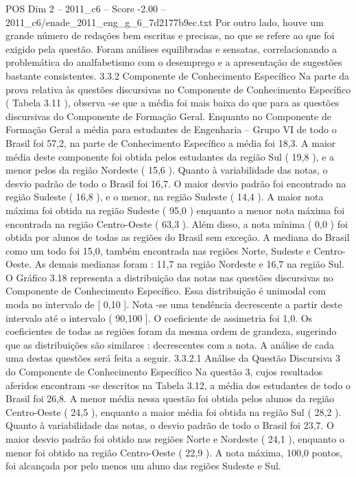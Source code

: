 \begin{textsample}{POS Dim 2 – 2011\_c6 – Score -2.00 – 2011\_c6/enade\_2011\_eng\_g\_6\_7d2177b9ec.txt}
Por outro lado, houve um grande número de redações bem escritas e precisas, no que se refere ao que foi exigido pela questão.
Foram análises equilibradas e sensatas, correlacionando a problemática do analfabetismo com o desemprego e a apresentação de sugestões bastante consistentes. 3.3.2 Componente de Conhecimento Específico Na parte da prova relativa às questões discursivas no Componente de Conhecimento Específico ( Tabela 3.11 ), observa -se que a média foi mais baixa do que para as questões discursivas do Componente de Formação Geral.
Enquanto no Componente de Formação Geral a média para estudantes de Engenharia – Grupo VI de todo o Brasil foi 57,2, na parte de Conhecimento Específico a média foi 18,3.
A maior média deste componente foi obtida pelos estudantes da região Sul ( 19,8 ), e a menor pelos da região Nordeste ( 15,6 ).
Quanto à variabilidade das notas, o desvio padrão de todo o Brasil foi 16,7.
O maior desvio padrão foi encontrado na região Sudeste ( 16,8 ), e o menor, na região Sudeste ( 14,4 ).
A maior nota máxima foi obtida na região Sudeste ( 95,0 ) enquanto a menor nota máxima foi encontrada na região Centro-Oeste ( 63,3 ).
Além disso, a nota mínima ( 0,0 ) foi obtida por alunos de todas as regiões do Brasil sem exceção.
A mediana do Brasil como um todo foi 15,0, também encontrada nas regiões Norte, Sudeste e Centro-Oeste.
As demais medianas foram : 11,7 na região Nordeste e 16,7 na região Sul.
O Gráfico 3.18 representa a distribuição das notas nas questões discursivas no Componente de Conhecimento Específico.
Essa distribuição é unimodal com moda no intervalo de [ 0,10 ].
Nota -se uma tendência decrescente a partir deste intervalo até o intervalo ( 90,100 ].
O coeficiente de assimetria foi 1,0.
Os coeficientes de todas as regiões foram da mesma ordem de grandeza, sugerindo que as distribuições são similares : decrescentes com a nota.
A análise de cada uma destas questões será feita a seguir. 3.3.2.1 Análise da Questão Discursiva 3 do Componente de Conhecimento Específico Na questão 3, cujos resultados aferidos encontram -se descritos na Tabela 3.12, a média dos estudantes de todo o Brasil foi 26,8.
A menor média nessa questão foi obtida pelos alunos da região Centro-Oeste ( 24,5 ), enquanto a maior média foi obtida na região Sul ( 28,2 ).
Quanto à variabilidade das notas, o desvio padrão de todo o Brasil foi 23,7.
O maior desvio padrão foi obtido nas regiões Norte e Nordeste ( 24,1 ), enquanto o menor foi obtido na região Centro-Oeste ( 22,9 ).
A nota máxima, 100,0 pontos, foi alcançada por pelo menos um aluno das regiões Sudeste e Sul.

\end{textsample}
